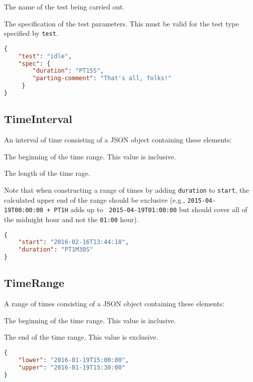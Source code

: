 \documentclass[10pt]{article}
\begin{document}
 The name of the test being carried out.

 The specification of the test parameters.
This must be valid for the test type specified by {\tt test}.

\example
\begin{lstlisting}[language=json]
{
    "test": "idle",
    "spec": {
        "duration": "PT15S",
        "parting-comment": "That's all, folks!"
     }
}
\end{lstlisting}




\subsection{TimeInterval}
An interval of time consisting of a JSON object containing these
elements:

 The beginning of the time range.  This
value is inclusive.

 The length of the time rage.

Note that when constructing a range of times by adding {\tt duration}
to {\tt start}, the calculated upper end of the range should be
exclusive (e.g., {\tt 2015-04-19T00:00:00 + PT1H} adds up to {\tt
  2015-04-19T01:00:00} but should cover all of the midnight hour and
not the {\tt 01:00} hour).

\example
\begin{lstlisting}[language=json]
{
    "start": "2016-02-16T13:44:18",
    "duration": "PT1M30S"
}
\end{lstlisting}


\subsection{TimeRange}
A range of times consisting of a JSON object containing these
elements:

 The beginning of the time range.  This
value is inclusive.

 The end of the time range.  This
value is exclusive.

\example
\begin{lstlisting}[language=json]
{
    "lower": "2016-01-19T15:00:00",
    "upper": "2016-01-19T15:30:00"
}
\end{lstlisting}
\end{document}
